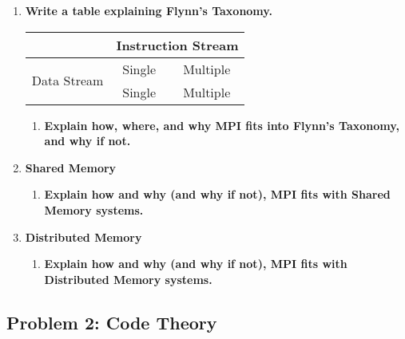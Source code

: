 \begin{enumerate}

\item \textbf{Write a table explaining Flynn’s Taxonomy.}

\begin{table}
\begin{center}
\begin{tabular}{c|cc}
& \multicolumn{2}{|c}{Instruction Stream}\\
\hline
\multirow{2}{*}{Data Stream} & Single & Multiple\\
& Single & Multiple\\
\end{tabular}
\end{center}
\end{table}

\begin{enumerate}

\item \textbf{Explain how, where, and why MPI fits into Flynn's Taxonomy, and why if not.}

\end{enumerate}

\item \textbf{Shared Memory}

\begin{enumerate}

\item \textbf{Explain how and why (and why if not), MPI fits with Shared Memory systems.}

\end{enumerate}

\item \textbf{Distributed Memory}

\begin{enumerate}

\item \textbf{Explain how and why (and why if not), MPI fits with Distributed Memory systems.}

\end{enumerate}

\end{enumerate}

\subsection*{Problem 2: Code Theory}

